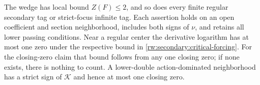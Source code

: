 \begin{proposition}
\label{rw:secondary:regular}
\label{rw:secondary:wedge}
The wedge has local bound $Z(F)\le2$, and so does every finite
regular secondary tag or strict-focus infinite tag.
Each assertion holds on an open coefficient and section neighborhood,
includes both signs of $\nu$, and retains all lower passing conditions.
Near a regular center the derivative logarithm has at most one zero
under the respective bound in \eqref{rw:secondary:critical-forcing}.
For the closing-zero
claim that bound follows from any one closing zero; if none exists,
there is nothing to count.
A lower-double action-dominated neighborhood has a strict sign of
$\mathcal K$ and hence at most one closing zero.
\end{proposition}

